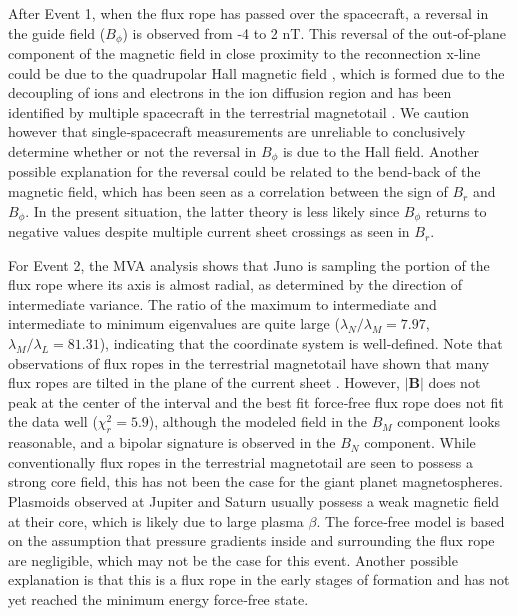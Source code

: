After Event 1, when the flux rope has passed over the spacecraft, a reversal in the guide field ($B_\phi$) is observed from -4 to 2 nT. This reversal of the out‐of‐plane component of the magnetic field in close proximity to the reconnection x‐line could be due to the quadrupolar Hall magnetic field \cite{Eastwood2007Multi-pointOn,Sonnerup1967MagnetopauseObservations}, which is formed due to the decoupling of ions and electrons in the ion diffusion region and has been identified by multiple spacecraft in the terrestrial magnetotail \cite{Nagai2001GeotailMagnetotail}. We caution however that single‐spacecraft measurements are unreliable to conclusively determine whether or not the reversal in $B_\phi$ is due to the Hall field. Another possible explanation for the reversal could be related to the bend-back of the magnetic field, which has been seen as a correlation between the sign of $B_r$ and $B_\phi$. In the present situation, the latter theory is less likely since $B_\phi$ returns to negative values despite multiple current sheet crossings as seen in $B_r$.

For Event 2, the MVA analysis shows that Juno is sampling the portion of the flux rope where its axis is almost radial, as determined by the direction of intermediate variance. The ratio of the maximum to intermediate and intermediate to minimum eigenvalues are quite large ($\lambda_N/\lambda_M =7.97$, $\lambda_M/\lambda_L=81.31$), indicating that the coordinate system is well‐defined. Note that observations of flux ropes in the terrestrial magnetotail have shown that many flux ropes are tilted in the plane of the current sheet \cite{Slavin2003GeotailSheet}. However, $|\mathbf{B}|$ does not peak at the center of the interval and the best fit force‐free flux rope does not fit the data well ($\chi_r^2 = 5.9$), although the modeled field in the $B_M$ component looks reasonable, and a bipolar signature is observed in the $B_N$ component. While conventionally flux ropes in the terrestrial magnetotail are seen to possess a strong core field, this has not been the case for the giant planet magnetospheres. Plasmoids observed at Jupiter and Saturn usually possess a weak magnetic field at their core, which is likely due to large plasma $\beta$. The force‐free model is based on the assumption that pressure gradients inside and surrounding the flux rope are negligible, which may not be the case for this event. Another possible explanation is that this is a flux rope in the early stages of formation and has not yet reached the minimum energy force‐free state.

